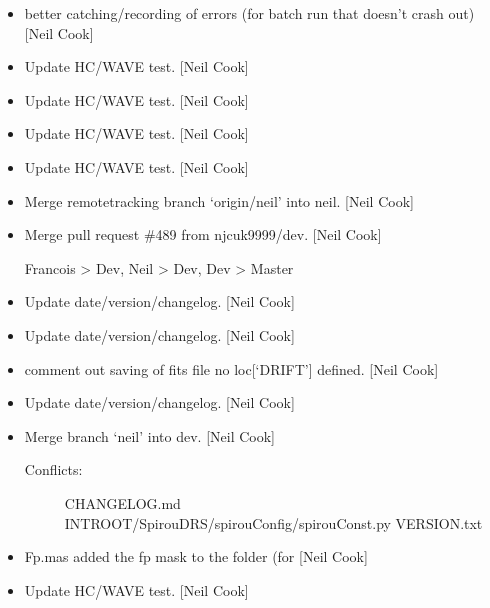 \documentclass[a4paper,10pt,english]{report}
\begin{document}
\begin{itemize}
\item {} 
 \sphinxhyphen{} better catching/recording of errors (for batch run that
doesn’t crash out) {[}Neil Cook{]}

\item {} 
Update HC/WAVE test. {[}Neil Cook{]}

\item {} 
Update HC/WAVE test. {[}Neil Cook{]}

\item {} 
Update HC/WAVE test. {[}Neil Cook{]}

\item {} 
Update HC/WAVE test. {[}Neil Cook{]}

\item {} 
Merge remote\sphinxhyphen{}tracking branch ‘origin/neil’ into neil. {[}Neil Cook{]}

\item {} 
Merge pull request \#489 from njcuk9999/dev. {[}Neil Cook{]}

Francois \textendash{}\textgreater{} Dev, Neil \textendash{}\textgreater{} Dev, Dev \textendash{}\textgreater{} Master

\item {} 
Update date/version/changelog. {[}Neil Cook{]}

\item {} 
Update date/version/changelog. {[}Neil Cook{]}

\item {} 
 \sphinxhyphen{} comment out saving of fits file \sphinxhyphen{} no
loc{[}‘DRIFT’{]} defined. {[}Neil Cook{]}

\item {} 
Update date/version/changelog. {[}Neil Cook{]}

\item {} 
Merge branch ‘neil’ into dev. {[}Neil Cook{]}
\begin{description}
\item[{Conflicts:}] \leavevmode
CHANGELOG.md
INTROOT/SpirouDRS/spirouConfig/spirouConst.py
VERSION.txt

\end{description}

\item {} 
Fp.mas \sphinxhyphen{} added the fp mask to the  folder (for 
{[}Neil Cook{]}

\item {} 
Update HC/WAVE test. {[}Neil Cook{]}

\end{itemize}
\end{document}
